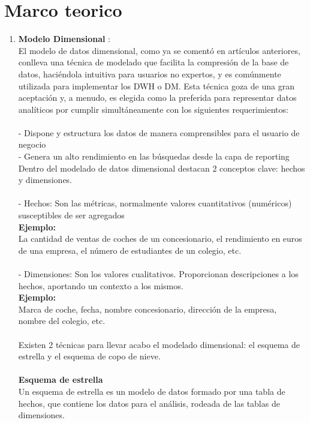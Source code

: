 \documentclass[twoside,twocolumn]{article}
\begin{document}
\section{Marco teorico}
\begin{enumerate}
\item \textbf{Modelo Dimensional }:\\
El modelo de datos dimensional, como ya se comentó en artículos anteriores, conlleva una técnica de modelado que facilita la compresión de la base de datos, haciéndola intuitiva para usuarios no expertos, y es comúnmente utilizada para implementar los DWH o DM.
Esta técnica goza de una gran aceptación y, a menudo, es elegida como la preferida para representar datos analíticos por cumplir simultáneamente con los siguientes requerimientos:\textbf{}\\
\textbf{}\\
- Dispone y estructura los datos de manera comprensibles para el usuario de negocio 
\textbf{}\\
- Genera un alto rendimiento en las búsquedas desde la capa de reporting
Dentro del modelado de datos dimensional destacan 2 conceptos clave: hechos y dimensiones.\textbf{}\\
\textbf{}\\
- Hechos: Son las métricas, normalmente valores cuantitativos (numéricos) susceptibles de ser agregados\textbf{}\\
\textbf{Ejemplo: }\\La cantidad de ventas de coches de un concesionario, el rendimiento en euros de una empresa, el número de estudiantes de un colegio, etc.\textbf{}\\
\textbf{}\\
- Dimensiones: Son los valores cualitativos. Proporcionan descripciones a los hechos, aportando un contexto a los mismos.\textbf{}\\
\textbf{Ejemplo: }\\Marca de coche, fecha, nombre concesionario, dirección de la empresa, nombre del colegio, etc.\textbf{}\\
\textbf{}\\
Existen 2 técnicas para llevar acabo el modelado dimensional: el esquema de estrella y el esquema de copo de nieve.
\textbf{}\\
\textbf{}\\
\textbf{Esquema de estrella}\\
Un esquema de estrella es un modelo de datos formado por una tabla de hechos, que contiene los datos para el análisis, rodeada de las tablas de dimensiones.


\end{enumerate}
\end{document}
